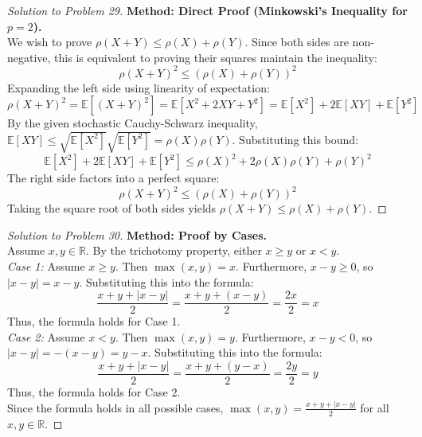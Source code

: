 \documentclass[11pt]{article}
\begin{document}
\begin{proof}[Solution to Problem 29]
    \textbf{Method: Direct Proof (Minkowski's Inequality for $p=2$).} \\
    We wish to prove $\rho(X + Y) \le \rho(X) + \rho(Y)$. Since both sides are non-negative, this is equivalent to proving their squares maintain the inequality:
    \[ \rho(X + Y)^2 \le (\rho(X) + \rho(Y))^2 \]
    Expanding the left side using linearity of expectation:
    \[ \rho(X + Y)^2 = \mathbb{E}[(X + Y)^2] = \mathbb{E}[X^2 + 2XY + Y^2] = \mathbb{E}[X^2] + 2\mathbb{E}[XY] + \mathbb{E}[Y^2] \]
    By the given stochastic Cauchy-Schwarz inequality, $\mathbb{E}[XY] \le \sqrt{\mathbb{E}[X^2]}\sqrt{\mathbb{E}[Y^2]} = \rho(X)\rho(Y)$. Substituting this bound:
    \[ \mathbb{E}[X^2] + 2\mathbb{E}[XY] + \mathbb{E}[Y^2] \le \rho(X)^2 + 2\rho(X)\rho(Y) + \rho(Y)^2 \]
    The right side factors into a perfect square:
    \[ \rho(X + Y)^2 \le (\rho(X) + \rho(Y))^2 \]
    Taking the square root of both sides yields $\rho(X + Y) \le \rho(X) + \rho(Y)$.
\end{proof}

\begin{proof}[Solution to Problem 30]
    \textbf{Method: Proof by Cases.} \\
    Assume $x, y \in \mathbb{R}$. By the trichotomy property, either $x \ge y$ or $x < y$. \\
    \textit{Case 1:} Assume $x \ge y$. Then $\max(x, y) = x$. Furthermore, $x - y \ge 0$, so $|x - y| = x - y$. Substituting this into the formula:
    \[ \frac{x + y + |x - y|}{2} = \frac{x + y + (x - y)}{2} = \frac{2x}{2} = x \]
    Thus, the formula holds for Case 1. \\
    \textit{Case 2:} Assume $x < y$. Then $\max(x, y) = y$. Furthermore, $x - y < 0$, so $|x - y| = -(x - y) = y - x$. Substituting this into the formula:
    \[ \frac{x + y + |x - y|}{2} = \frac{x + y + (y - x)}{2} = \frac{2y}{2} = y \]
    Thus, the formula holds for Case 2. \\
    Since the formula holds in all possible cases, $\max(x, y) = \frac{x + y + |x - y|}{2}$ for all $x, y \in \mathbb{R}$.
\end{proof}

\newpage

\end{document}
